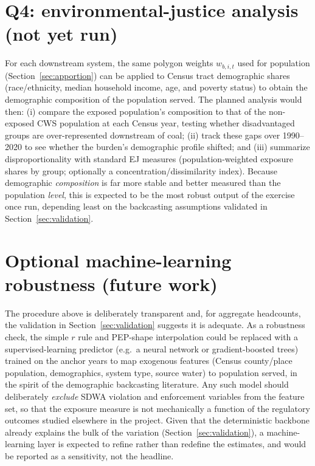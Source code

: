 \documentclass[11pt]{article}
\begin{document}
\section{Q4: environmental-justice analysis (not yet run)}
\label{sec:ej}

For each downstream system, the same polygon weights $w_{b,i,t}$ used for
population (Section~\ref{sec:apportion}) can be applied to Census tract
demographic shares (race/ethnicity, median household income, age, and poverty
status) to obtain the demographic composition of the population served. The
planned analysis would then: (i) compare the exposed population's composition
to that of the non-exposed CWS population at each Census year, testing whether
disadvantaged groups are over-represented downstream of coal; (ii) track these
gaps over 1990--2020 to see whether the burden's demographic profile shifted;
and (iii) summarize disproportionality with standard EJ measures
(population-weighted exposure shares by group; optionally a
concentration/dissimilarity index). Because demographic \emph{composition} is
far more stable and better measured than the population \emph{level}, this is
expected to be the most robust output of the exercise once run, depending
least on the backcasting assumptions validated in Section~\ref{sec:validation}.

\section{Optional machine-learning robustness (future work)}
\label{sec:ml}

The procedure above is deliberately transparent and, for aggregate headcounts,
the validation in Section~\ref{sec:validation} suggests it is adequate. As a
robustness check, the simple $r$ rule and PEP-shape interpolation could be
replaced with a supervised-learning predictor (e.g.\ a neural network or
gradient-boosted trees) trained on the anchor years to map exogenous features
(Census county/place population, demographics, system type, source water) to
population served, in the spirit of the demographic backcasting literature.
Any such model should deliberately \emph{exclude} SDWA violation and
enforcement variables from the feature set, so that the exposure measure is
not mechanically a function of the regulatory outcomes studied elsewhere in
the project. Given that the deterministic backbone already explains the bulk
of the variation (Section~\ref{sec:validation}), a machine-learning layer is
expected to refine rather than redefine the estimates, and would be reported
as a sensitivity, not the headline.
\end{document}
